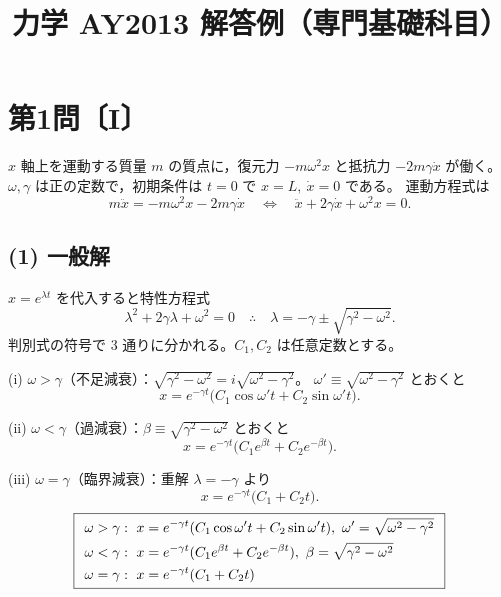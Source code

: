 \documentclass[11pt,a4paper]{article}
\title{力学 AY2013 解答例（専門基礎科目）}
\author{}
\date{}
\begin{document}
\maketitle

\section*{第1問〔I〕}

$x$ 軸上を運動する質量 $m$ の質点に，復元力 $-m\omega^2 x$ と抵抗力 $-2m\gamma\dot{x}$
が働く。$\omega,\gamma$ は正の定数で，初期条件は $t=0$ で $x=L,\ \dot{x}=0$ である。
運動方程式は
\[
  m\ddot{x}=-m\omega^2 x-2m\gamma\dot{x}
  \quad\Longleftrightarrow\quad
  \ddot{x}+2\gamma\dot{x}+\omega^2 x=0 .
\]

\subsection*{(1) 一般解}
$x=e^{\lambda t}$ を代入すると特性方程式
\[
  \lambda^2+2\gamma\lambda+\omega^2=0
  \quad\therefore\quad
  \lambda=-\gamma\pm\sqrt{\gamma^2-\omega^2}.
\]
判別式の符号で 3 通りに分かれる。$C_1,C_2$ は任意定数とする。

\medskip
(i) $\omega>\gamma$（不足減衰）：$\sqrt{\gamma^2-\omega^2}=i\sqrt{\omega^2-\gamma^2}$。
$\omega'\equiv\sqrt{\omega^2-\gamma^2}$ とおくと
\[
  x=e^{-\gamma t}\bigl(C_1\cos\omega' t+C_2\sin\omega' t\bigr).
\]

(ii) $\omega<\gamma$（過減衰）：$\beta\equiv\sqrt{\gamma^2-\omega^2}$ とおくと
\[
  x=e^{-\gamma t}\bigl(C_1 e^{\beta t}+C_2 e^{-\beta t}\bigr).
\]

(iii) $\omega=\gamma$（臨界減衰）：重解 $\lambda=-\gamma$ より
\[
  x=e^{-\gamma t}\bigl(C_1+C_2 t\bigr).
\]
\[
  \boxed{\,\;
  \begin{aligned}
    &\omega>\gamma:\ x=e^{-\gamma t}(C_1\cos\omega' t+C_2\sin\omega' t),\ \omega'=\sqrt{\omega^2-\gamma^2}\\
    &\omega<\gamma:\ x=e^{-\gamma t}(C_1 e^{\beta t}+C_2 e^{-\beta t}),\ \beta=\sqrt{\gamma^2-\omega^2}\\
    &\omega=\gamma:\ x=e^{-\gamma t}(C_1+C_2 t)
  \end{aligned}\;\,}
\]
\end{document}
